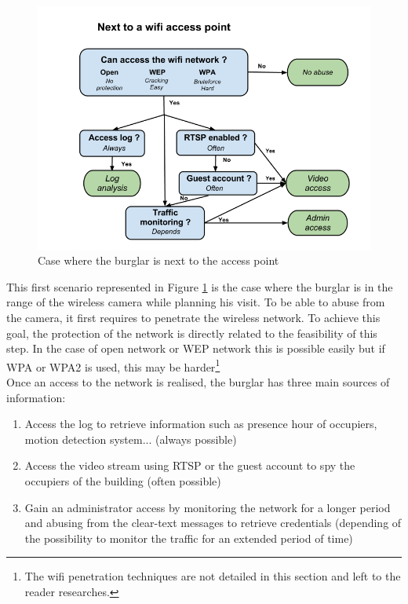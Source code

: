 \begin{figure}[h]
  \centering
  \includegraphics[width=13cm]{images/burglar-inside.png}
  \caption{Case where the burglar is next to the access point}
  \label{fig:burglar-inside}
\end{figure}

This first scenario represented in Figure \ref{fig:burglar-inside} is the case where the burglar is in the range of the wireless camera while planning his visit.
To be able to abuse from the camera, it first requires to penetrate the wireless network.
To achieve this goal, the protection of the network is directly related to the feasibility of this step.
In the case of open network or WEP network this is possible easily but if WPA or WPA2 is used, this may be harder\footnote{The wifi penetration techniques are not detailed in this section and left to the reader researches.}\\

Once an access to the network is realised, the burglar has three main sources of information:
\begin{enumerate}
\item Access the log to retrieve information such as presence hour of occupiers, motion detection system... (always possible)
\item Access the video stream using RTSP or the guest account to spy the occupiers of the building (often possible)
\item Gain an administrator access by monitoring the network for a longer period and abusing from the clear-text messages to retrieve credentials (depending of the possibility to monitor the traffic for an extended period of time)
\end{enumerate}


